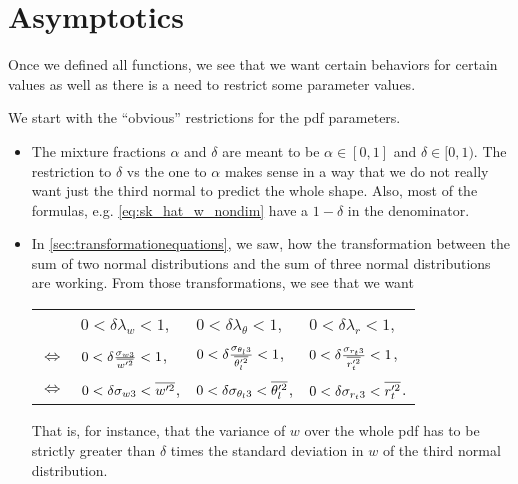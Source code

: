 \chapter{Asymptotics}\label{ch:asymptotics}

Once we defined all functions, we see that we want certain behaviors for certain values as well as there is a need to restrict some parameter values.

We start with the \enquote{obvious} restrictions for the \gls{pdf} parameters.
\begin{itemize}
    \item The mixture fractions $\alpha$ and $\delta$ are meant to be $\alpha \in [0,1]$ and $\delta \in [0,1)$.
    The restriction to $\delta$ vs the one to $\alpha$ makes sense in a way
    that we do not really want just the third normal to predict the whole shape.
    Also, most of the formulas, e.g. \cref{eq:sk_hat_w_nondim} have a $1-\delta$ in the denominator.

    \item In \cref{sec:transformationequations}, we saw,
    how the transformation between the sum of two normal distributions
    and the sum of three normal distributions are working.
    From those transformations, we see that we want
    \begin{table}[!htb]
        \centering
        \begin{tabular}{llll}
            &
            $0 < \delta\lambda_w < 1$, &
            $0 < \delta\lambda_\theta < 1$, &
            $0 < \delta\lambda_r < 1$, \\
            $\iff$ &
            $0 < \delta\frac{\sigma_{w3}}{\overline{w'^2}} < 1$, &
            $0 < \delta\frac{\sigma_{\theta_l 3}}{\overline{\theta_l'^2}} < 1$, &
            $0 < \delta\frac{\sigma_{r_t 3}}{\overline{r_t'^2}} < 1$, \\
            $\iff$ &
            $0 < \delta\sigma_{w3} < \overline{w'^2}$, &
            $0 < \delta\sigma_{\theta_l 3} < \overline{\theta_l'^2}$, &
            $0 < \delta\sigma_{r_t 3} < \overline{r_t'^2}$.
        \end{tabular}
        \label{tab:table_asymp_2}
    \end{table}

    That is, for instance,
    that the variance of $w$ over the whole \gls{pdf} has to be strictly greater than $\delta$ times the standard deviation in $w$ of the third normal distribution.
\end{itemize}

